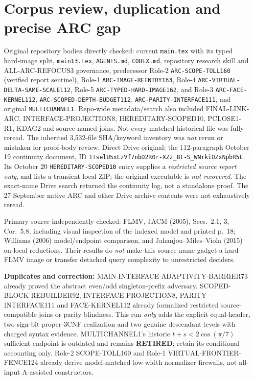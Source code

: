 \documentclass[11pt]{article}
\begin{document}
\section{Corpus review, duplication and precise ARC gap}
Original repository bodies directly checked: current
\texttt{main.tex} with its typed hard-image split, \texttt{main13.tex},
\texttt{AGENTS.md}, \texttt{CODEX.md}, repository research skill and
ALL-ARC-REFOCUS3 governance, predecessor Role-2
\texttt{ARC-SCOPE-TOLL160} (verified report sentinel), Role-1
\texttt{ARC-IMAGE-REENTRY163}, Role-4
\texttt{ARC-VIRTUAL-DELTA-SAME-SCALE112}, Role-5
\texttt{ARC-TYPED-HARD-IMAGE162}, and Role-3
\texttt{ARC-FACE-KERNEL112}, \texttt{ARC-SCOPED-DEPTH-BUDGET112},
\texttt{ARC-PARITY-INTERFACE111}, and original
\texttt{MULTICHANNEL1}. Repo-wide metadata/search also included
FINAL-LINK-ARC, INTERFACE-PROJECTION8, HEREDITARY-SCOPED10,
PCLOSE1-R1, KDAG2 and source-named joins. Not every matched
historical file was fully reread. The inherited 3,532-file SHA/keyword
inventory was \emph{not} rerun or mistaken for proof-body review.
Direct Drive original: the 112-paragraph October 19 continuity
document, ID
\texttt{1TselU5xLzVf7nbD2R0r-XZz\_8t-S\_WNrkiOZxNpbR5E}.
Its October 20 \texttt{HEREDITARY-SCOPED10} entry supplies a
\emph{restricted source report only}, and lists a transient local ZIP;
the original executable is \emph{not recovered}. The exact-name
Drive search returned the continuity log, not a standalone proof.
The 27 September native ARC and other Drive archive contents were
not exhaustively reread.

Primary source independently checked: FLMV, JACM (2005),
Secs.~2.1, 3, Cor.~5.8, including visual inspection of the
indexed model and printed p.~18; Williams (2006) model/endpoint
comparison, and Jahanjou--Miles--Viola (2015) on local reductions.
Their results do \emph{not} make this source-name gadget a hard
FLMV image or transfer detached query complexity to unrestricted
deciders.

\noindent\textbf{Duplicates and correction:}
MAIN INTERFACE-ADAPTIVITY-BARRIER73 already proved the abstract
even/odd singleton-prefix adversary. SCOPED-BLOCK-REBUILDER92,
INTERFACE-PROJECTION8, PARITY-INTERFACE111 and FACE-KERNEL112
already formalized restricted source-compatible joins or parity
blindness. This run \emph{only} adds the explicit equal-header,
two-sign-bit proper-3CNF realization and two genuine descendant levels
with charged syntax evidence. MULTICHANNEL1's historic
$t+s<2\cos(\pi/7)$ sufficient endpoint is outdated and remains
\textbf{RETIRED}; retain its conditional accounting only. Role-2
SCOPE-TOLL160 and Role-1 VIRTUAL-FRONTIER-FENCE124 already derive
model-matched low-width normalizer firewalls, not all-input
A-assisted constructors.
\end{document}
